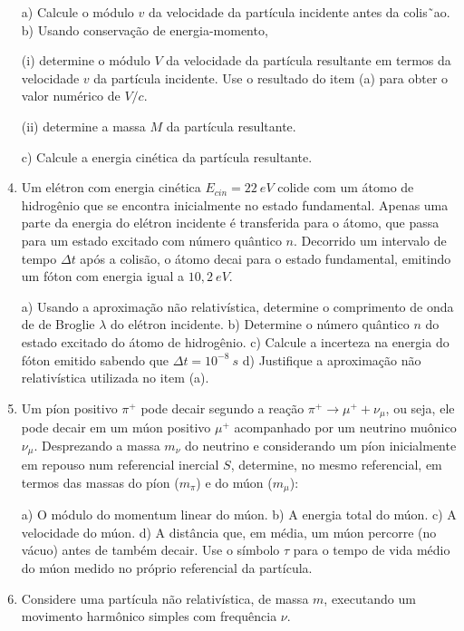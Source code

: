 \begin{enumerate}[start=1,label={\bfseries Q\arabic*.}]
a) Calcule o módulo $v$ da velocidade da partícula incidente antes da colis˜ao.
b) Usando conservação de energia-momento,
    
    \item[(i)] determine o módulo $V$ da velocidade da partícula resultante em termos da velocidade $v$ da partícula incidente. Use o resultado do item (a) para obter o valor numérico de $V/c$.
    \item[(ii)] determine a massa $M$ da partícula resultante.
    
c) Calcule a energia cinética da partícula resultante.




\item Um elétron com energia cinética $E_{cin} = 22 \ eV$ colide com um átomo de hidrogênio que se encontra inicialmente no estado fundamental. Apenas uma parte da energia do elétron incidente é transferida para o átomo, que passa para um estado excitado com número quântico $n$. Decorrido um intervalo de tempo $\Delta t$ após a colisão, o átomo decai para o estado fundamental, emitindo um fóton com energia igual a $10,2 \ eV$.


a) Usando a aproximação não relativística, determine o comprimento de onda de de Broglie $\lambda$ do elétron incidente.
b) Determine o número quântico $n$ do estado excitado do átomo de hidrogênio.
c) Calcule a incerteza na energia do fóton emitido sabendo que $\Delta t = 10^{-8} \ s$
d) Justifique a aproximação não relativística utilizada no item (a).



\item Um píon positivo $\pi^{+}$ pode decair segundo a reação $\pi^{+} \rightarrow \mu^{+} + \nu_{\mu}$, ou seja, ele pode decair em um múon positivo $\mu^{+}$ acompanhado por um neutrino muônico $\nu_{\mu}$. Desprezando a massa $m_{\nu}$ do neutrino e considerando um píon inicialmente em repouso num referencial inercial $S$, determine, no mesmo referencial, em termos das massas do píon ($m_{\pi}$) e do múon ($m_{\mu}$):


a) O módulo do momentum linear do múon.
b) A energia total do múon.
c) A velocidade do múon.
d) A distância que, em média, um múon percorre (no vácuo) antes de também decair. Use o símbolo $\tau$ para o tempo de vida médio do múon medido no próprio referencial da partícula.


\item Considere uma partícula não relativística, de massa $m$, executando um movimento harmônico simples com frequência $\nu$.



\end{enumerate}
